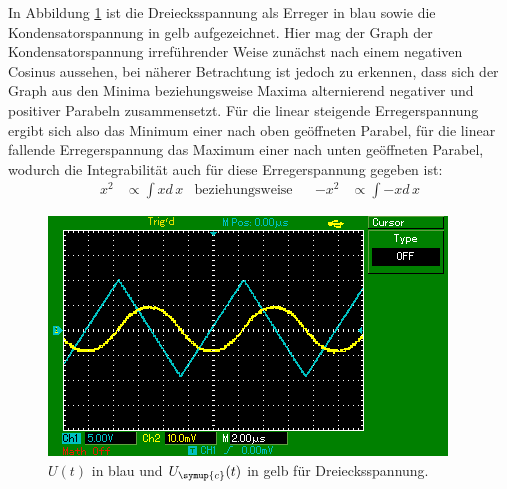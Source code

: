 In Abbildung \ref{fig:int_drei} ist die Dreiecksspannung
als Erreger in blau sowie die Kondensatorspannung in gelb aufgezeichnet.
Hier mag der Graph der Kondensatorspannung irreführender Weise zunächst
nach einem negativen Cosinus aussehen, bei näherer Betrachtung ist jedoch zu
erkennen, dass sich der Graph aus den Minima beziehungsweise Maxima
alternierend negativer und positiver Parabeln zusammensetzt.
Für die linear steigende Erregerspannung ergibt sich also das Minimum einer
nach oben geöffneten Parabel, für die linear fallende Erregerspannung
das Maximum einer nach unten geöffneten Parabel, wodurch die Integrabilität
auch für diese Erregerspannung gegeben ist:
\begin{align}
  x^2 &\propto \int x d\, x &\text{beziehungsweise}&& -x^2 &\propto \int -x d\, x
\end{align}
\begin{figure}[H]
  \centering
  \includegraphics{content/images/d/dreieck.png}
  \caption{$U(t)$ in blau und $U_{\symup{c}}(t)$ in gelb für Dreiecksspannung.}
  \label{fig:int_drei}
\end{figure}

